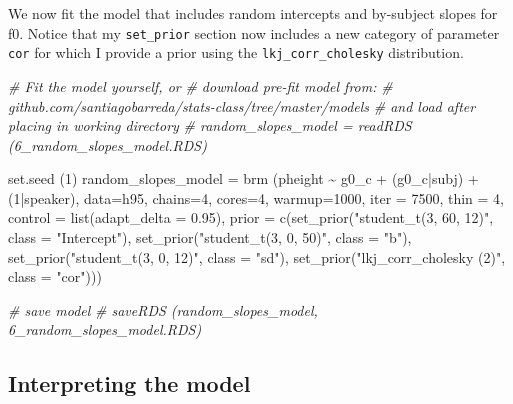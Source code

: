 \documentclass[
]{book}
\newenvironment{Shaded}{\begin{snugshade}}{\end{snugshade}}
\newcommand{\AttributeTok}[1]{\textcolor[rgb]{0.77,0.63,0.00}{#1}}
\newcommand{\CommentTok}[1]{\textcolor[rgb]{0.56,0.35,0.01}{\textit{#1}}}
\newcommand{\DecValTok}[1]{\textcolor[rgb]{0.00,0.00,0.81}{#1}}
\newcommand{\FloatTok}[1]{\textcolor[rgb]{0.00,0.00,0.81}{#1}}
\newcommand{\FunctionTok}[1]{\textcolor[rgb]{0.00,0.00,0.00}{#1}}
\newcommand{\NormalTok}[1]{#1}
\newcommand{\OtherTok}[1]{\textcolor[rgb]{0.56,0.35,0.01}{#1}}
\newcommand{\SpecialCharTok}[1]{\textcolor[rgb]{0.00,0.00,0.00}{#1}}
\newcommand{\StringTok}[1]{\textcolor[rgb]{0.31,0.60,0.02}{#1}}
\begin{document}
We now fit the model that includes random intercepts and by-subject slopes for f0. Notice that my \texttt{set\_prior} section now includes a new category of parameter \texttt{cor} for which I provide a prior using the \texttt{lkj\_corr\_cholesky} distribution.

\begin{Shaded}
\begin{Highlighting}[]
\CommentTok{\# Fit the model yourself, or}
\CommentTok{\# download pre{-}fit model from: }
\CommentTok{\# github.com/santiagobarreda/stats{-}class/tree/master/models}
\CommentTok{\# and load after placing in working directory}
\CommentTok{\# random\_slopes\_model = readRDS (\textquotesingle{}6\_random\_slopes\_model.RDS\textquotesingle{})}

\FunctionTok{set.seed}\NormalTok{ (}\DecValTok{1}\NormalTok{)}
\NormalTok{random\_slopes\_model }\OtherTok{=}
  \FunctionTok{brm}\NormalTok{ (pheight }\SpecialCharTok{\textasciitilde{}}\NormalTok{ g0\_c }\SpecialCharTok{+}\NormalTok{ (g0\_c}\SpecialCharTok{|}\NormalTok{subj) }\SpecialCharTok{+}\NormalTok{ (}\DecValTok{1}\SpecialCharTok{|}\NormalTok{speaker), }\AttributeTok{data=}\NormalTok{h95, }\AttributeTok{chains=}\DecValTok{4}\NormalTok{, }\AttributeTok{cores=}\DecValTok{4}\NormalTok{,  }
       \AttributeTok{warmup=}\DecValTok{1000}\NormalTok{, }\AttributeTok{iter =} \DecValTok{7500}\NormalTok{, }\AttributeTok{thin =} \DecValTok{4}\NormalTok{, }\AttributeTok{control =} \FunctionTok{list}\NormalTok{(}\AttributeTok{adapt\_delta =} \FloatTok{0.95}\NormalTok{), }
       \AttributeTok{prior =} \FunctionTok{c}\NormalTok{(}\FunctionTok{set\_prior}\NormalTok{(}\StringTok{"student\_t(3, 60, 12)"}\NormalTok{, }\AttributeTok{class =} \StringTok{"Intercept"}\NormalTok{),}
                 \FunctionTok{set\_prior}\NormalTok{(}\StringTok{"student\_t(3, 0, 50)"}\NormalTok{, }\AttributeTok{class =} \StringTok{"b"}\NormalTok{),}
                 \FunctionTok{set\_prior}\NormalTok{(}\StringTok{"student\_t(3, 0, 12)"}\NormalTok{, }\AttributeTok{class =} \StringTok{"sd"}\NormalTok{),}
                 \FunctionTok{set\_prior}\NormalTok{(}\StringTok{"lkj\_corr\_cholesky (2)"}\NormalTok{, }\AttributeTok{class =} \StringTok{"cor"}\NormalTok{)))}

\CommentTok{\# save model}
\CommentTok{\# saveRDS (random\_slopes\_model, \textquotesingle{}6\_random\_slopes\_model.RDS\textquotesingle{})}
\end{Highlighting}
\end{Shaded}

\hypertarget{interpreting-the-model-5}{%
\subsection{Interpreting the model}\label{interpreting-the-model-5}}
\end{document}
